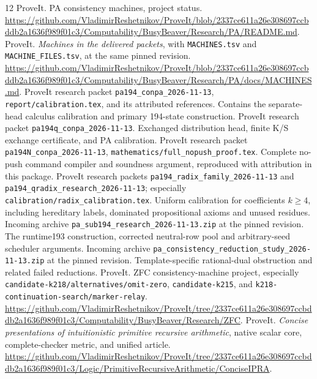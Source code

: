 \documentclass[11pt,letterpaper]{article}
\newcommand{\file}[1]{\begingroup\def\UrlBreaks{\do\/\do\_\do\-\do\.}\texttt{\nolinkurl{#1}}\endgroup}
\begin{document}
\clearpage
\begin{thebibliography}{12}
 ProveIt. PA consistency machines, project status.
\url{https://github.com/VladimirReshetnikov/ProveIt/blob/2337ce611a26e308697ccbddb2a1636f989f01c3/Computability/BusyBeaver/Research/PA/README.md}.
 ProveIt. \emph{Machines in the delivered packets}, with
\file{MACHINES.tsv} and \file{MACHINE_FILES.tsv}, at the same pinned revision.
\url{https://github.com/VladimirReshetnikov/ProveIt/blob/2337ce611a26e308697ccbddb2a1636f989f01c3/Computability/BusyBeaver/Research/PA/docs/MACHINES.md}.
 ProveIt research packet \file{pa194_conpa_2026-11-13},
\file{report/calibration.tex}, and its attributed references. Contains the
separate-head calculus calibration and primary 194-state construction.
 ProveIt research packet \file{pa194q_conpa_2026-11-13}.
Exchanged distribution head, finite K/S exchange certificate, and PA calibration.
 ProveIt research packet \file{pa194N_conpa_2026-11-13},
\file{mathematics/full_nopush_proof.tex}. Complete no-push command compiler and soundness
argument, reproduced with attribution in this package.
 ProveIt research packets \file{pa194_radix_family_2026-11-13}
and \file{pa194_qradix_research_2026-11-13}; especially
\file{calibration/radix_calibration.tex}. Uniform calibration for coefficients
$k\ge4$, including hereditary labels, dominated propositional axioms and unused
residues.
 Incoming archive \file{pa_sub194_research_2026-11-13.zip}
at the pinned revision. The runtime193 construction, corrected neutral-row
pool and arbitrary-seed scheduler arguments.
 Incoming archive
\file{pa_consistency_reduction_study_2026-11-13.zip} at the pinned revision.
Template-specific rational-dual obstruction and related failed reductions.
 ProveIt. ZFC consistency-machine project, especially
\file{candidate-k218/alternatives/omit-zero}, \file{candidate-k215}, and
\file{k218-continuation-search/marker-relay}.
\url{https://github.com/VladimirReshetnikov/ProveIt/tree/2337ce611a26e308697ccbddb2a1636f989f01c3/Computability/BusyBeaver/Research/ZFC}.
 ProveIt. \emph{Concise presentations of intuitionistic primitive
recursive arithmetic}, native scalar core, complete-checker metric, and unified
article.
\url{https://github.com/VladimirReshetnikov/ProveIt/tree/2337ce611a26e308697ccbddb2a1636f989f01c3/Logic/PrimitiveRecursiveArithmetic/ConciseIPRA}.
\end{thebibliography}
\end{document}
